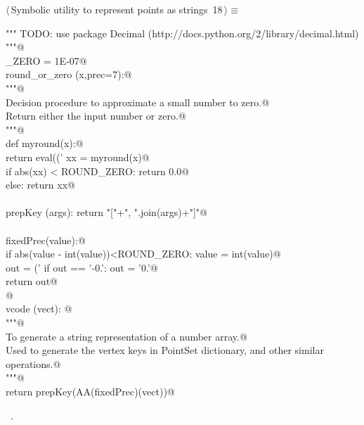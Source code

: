 \documentclass[11pt,oneside]{article}	%
\begin{document}
\begin{flushleft} \small \label{scrap44}
\protect{}$\langle\,$Symbolic utility to represent points as strings\nobreak\ {\footnotesize 18}$\,\rangle\equiv$
\vspace{-1ex}
\begin{list}{}{} \item
\mbox{}\verb@""" TODO: use package Decimal (http://docs.python.org/2/library/decimal.html) """@\\
\mbox{}\verb@ROUND_ZERO = 1E-07@\\
\mbox{}\verb@def round_or_zero (x,prec=7):@\\
\mbox{}\verb@   """@\\
\mbox{}\verb@   Decision procedure to approximate a small number to zero.@\\
\mbox{}\verb@   Return either the input number or zero.@\\
\mbox{}\verb@   """@\\
\mbox{}\verb@   def myround(x):@\\
\mbox{}\verb@      return eval(('%.'+str(prec)+'f') % round(x,prec))@\\
\mbox{}\verb@   xx = myround(x)@\\
\mbox{}\verb@   if abs(xx) < ROUND_ZERO: return 0.0@\\
\mbox{}\verb@   else: return xx@\\
\mbox{}\verb@@\\
\mbox{}\verb@def prepKey (args): return "["+", ".join(args)+"]"@\\
\mbox{}\verb@@\\
\mbox{}\verb@def fixedPrec(value):@\\
\mbox{}\verb@   if abs(value - int(value))<ROUND_ZERO: value = int(value)@\\
\mbox{}\verb@   out = ('%0.7f'% value).rstrip('0')@\\
\mbox{}\verb@   if out == '-0.': out = '0.'@\\
\mbox{}\verb@   return out@\\
\mbox{}\verb@   @\\
\mbox{}\verb@def vcode (vect): @\\
\mbox{}\verb@   """@\\
\mbox{}\verb@   To generate a string representation of a number array.@\\
\mbox{}\verb@   Used to generate the vertex keys in PointSet dictionary, and other similar operations.@\\
\mbox{}\verb@   """@\\
\mbox{}\verb@   return prepKey(AA(fixedPrec)(vect))@\\
\mbox{}\verb@@{\NWsep}
\end{list}
\vspace{-1ex}
\footnotesize\addtolength{\baselineskip}{-1ex}
\begin{list}{}{\setlength{\itemsep}{-\parsep}\setlength{\itemindent}{-\leftmargin}}
\item \NWtxtMacroRefIn\ .
\end{list}
\end{flushleft}






\end{document}

